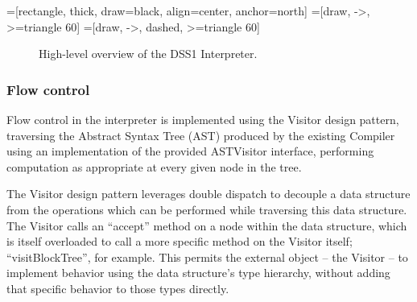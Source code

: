 \documentclass[12pt,letterpaper]{article}
\begin{document}
{=[rectangle,
                   thick, 
                   draw=black, 
                   align=center,
                   anchor=north]
=[draw, ->, >=triangle 60]
=[draw, ->, dashed, >=triangle 60]
\begin{figure}
\begin{center}
\end{center}
\caption{High-level overview of the DSS1 Interpreter.}
\label{fig:INTERPRETER}
\end{figure}

\subsubsection{Flow control}

	Flow control in the interpreter is implemented using the Visitor design pattern, traversing the Abstract Syntax Tree (AST) produced by the existing Compiler using an implementation of the provided ASTVisitor interface, performing computation as appropriate at every given node in the tree.

	The Visitor design pattern leverages double dispatch to decouple a data structure from the operations which can be performed while traversing this data structure. The Visitor calls an “accept” method on a node within the data structure, which is itself overloaded to call a more specific method on the Visitor itself; “visitBlockTree”, for example. This permits the external object – the Visitor – to implement behavior using the data structure's type hierarchy, without adding that specific behavior to those types directly.

}
\end{document}
